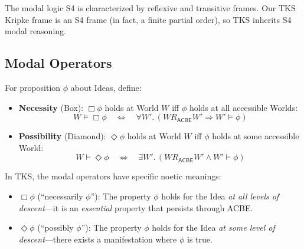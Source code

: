 \begin{remark}
The modal logic S4 is characterized by reflexive and transitive frames.
Our TKS Kripke frame is an S4 frame (in fact, a finite partial order),
so TKS inherits S4 modal reasoning.
\end{remark}

\subsection{Modal Operators}
\label{subsec:modal-operators}

\begin{definition}
\label{def:necessity-possibility}
For proposition $\phi$ about Ideas, define:
\begin{itemize}
  \item \textbf{Necessity} (Box): $\Box \phi$ holds at World $W$ iff $\phi$ holds
        at all accessible Worlds:
        \[
          W \vDash \Box \phi \quad\iff\quad \forall W'.\, (W \mathrel{R_{\mathsf{ACBE}}} W' \Rightarrow W' \vDash \phi)
        \]
  \item \textbf{Possibility} (Diamond): $\Diamond \phi$ holds at World $W$ iff $\phi$ holds
        at some accessible World:
        \[
          W \vDash \Diamond \phi \quad\iff\quad \exists W'.\, (W \mathrel{R_{\mathsf{ACBE}}} W' \land W' \vDash \phi)
        \]
\end{itemize}
\end{definition}

\begin{definition}
\label{def:tks-modal-noetic}
In TKS, the modal operators have specific noetic meanings:
\begin{itemize}
  \item $\Box \phi$ (``necessarily $\phi$''): The property $\phi$ holds for the Idea
        \emph{at all levels of descent}---it is an \emph{essential} property
        that persists through ACBE.
  \item $\Diamond \phi$ (``possibly $\phi$''): The property $\phi$ holds for the Idea
        \emph{at some level of descent}---there exists a manifestation where $\phi$
        is true.
\end{itemize}
\end{definition}

